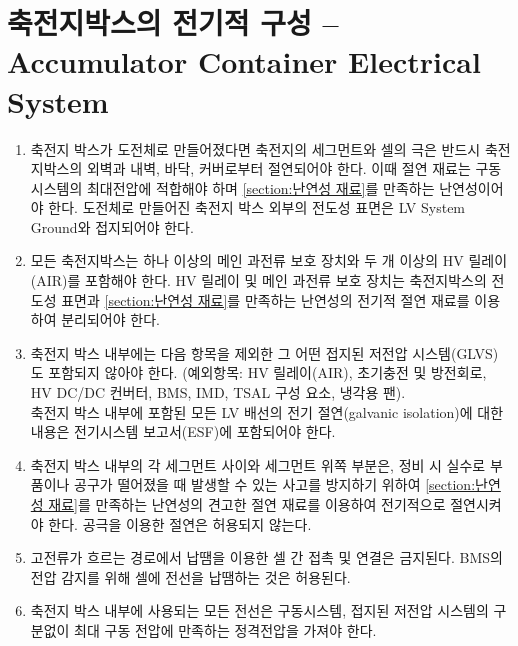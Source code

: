 \documentclass[final,a4paper,10pt]{report}
\begin{document}
\section{축전지박스의 전기적 구성 – Accumulator Container Electrical System}\label{rule:formula-technical.accumulator-container-electrical}
\begin{enumerate}
  \item\label{rule:formula-technical.accumulator-container-electrical.insulation-and-lv-grounding} 축전지 박스가 도전체로 만들어졌다면 축전지의 세그먼트와 셀의 극은 반드시 축전지박스의 외벽과 내벽, 바닥, 커버로부터 절연되어야 한다. 이때 절연 재료는 구동시스템의 최대전압에 적합해야 하며 \ref{section:난연성 재료}를 만족하는 난연성이어야 한다. 도전체로 만들어진 축전지 박스 외부의 전도성 표면은 LV System Ground와 접지되어야 한다.
  \item\label{rule:formula-technical.accumulator-container-electrical.overcurrent-and-air-minimums} 모든 축전지박스는 하나 이상의 메인 과전류 보호 장치와 두 개 이상의 HV 릴레이(AIR)를 포함해야 한다. HV 릴레이 및 메인 과전류 보호 장치는 축전지박스의 전도성 표면과 \ref{section:난연성 재료}를 만족하는 난연성의 전기적 절연 재료를 이용하여 분리되어야 한다.
  \item\label{rule:formula-technical.accumulator-container-electrical.glvs-component-exceptions} 축전지 박스 내부에는 다음 항목을 제외한 그 어떤 접지된 저전압 시스템(GLVS)도 포함되지 않아야 한다. (예외항목: HV 릴레이(AIR), 초기충전 및 방전회로, HV DC/DC 컨버터, BMS, IMD, TSAL 구성 요소, 냉각용 팬).\\
    축전지 박스 내부에 포함된 모든 LV 배선의 전기 절연(galvanic isolation)에 대한 내용은 전기시스템 보고서(ESF)에 포함되어야 한다.
  \item\label{rule:formula-technical.accumulator-container-electrical.solid-inter-segment-insulation} 축전지 박스 내부의 각 세그먼트 사이와 세그먼트 위쪽 부분은, 정비 시 실수로 부품이나 공구가 떨어졌을 때 발생할 수 있는 사고를 방지하기 위하여 \ref{section:난연성 재료}를 만족하는 난연성의 견고한 절연 재료를 이용하여 전기적으로 절연시켜야 한다. 공극을 이용한 절연은 허용되지 않는다.
  \item\label{rule:formula-technical.accumulator-container-electrical.high-current-solder-ban} 고전류가 흐르는 경로에서 납땜을 이용한 셀 간 접촉 및 연결은 금지된다. BMS의 전압 감지를 위해 셀에 전선을 납땜하는 것은 허용된다.
  \item\label{rule:formula-technical.accumulator-container-electrical.wire-voltage-rating} 축전지 박스 내부에 사용되는 모든 전선은 구동시스템, 접지된 저전압 시스템의 구분없이 최대 구동 전압에 만족하는 정격전압을 가져야 한다.


\end{enumerate}
\end{document}
